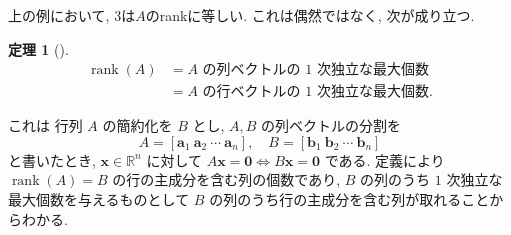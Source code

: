 \documentclass[dvipdfmx,a4paper,11pt]{article} %
\theoremstyle{definition}
\newtheorem{thm}{定理}[section]
\begin{document}
上の例において, $3$は$A$のrankに等しい. 
これは偶然ではなく, 次が成り立つ. 

\begin{thm}[{\cite[定理4.3.3]{M}}] 
\label{thm-M-4.3.3}
\[
\begin{aligned}
\operatorname{rank}(A)
&=A\text{ の列ベクトルの \(1\) 次独立な最大個数}\\
&=A\text{ の行ベクトルの \(1\) 次独立な最大個数}.
\end{aligned}
\]
\end{thm}
これは
行列 \(A\) の簡約化を \(B\) とし, \(A,B\) の列ベクトルの分割を
\[
A=[\bm{a}_1\ \bm{a}_2\ \cdots\ \bm{a}_n],
\quad
B=[\bm{b}_1\ \bm{b}_2\ \cdots\ \bm{b}_n]
\]
と書いたとき, \(\bm{x}\in\mathbb{R}^n\) に対して
\(
A\bm{x}=\bm{0}\Longleftrightarrow B\bm{x}=\bm{0}
\)
である. 
定義により\(\operatorname{rank}(A) = B\text{ の行の主成分を含む列の個数}\)であり, \(B\) の列のうち \(1\) 次独立な最大個数を与えるものとして \(B\) の列のうち行の主成分を含む列が取れることからわかる. 
\end{document}
